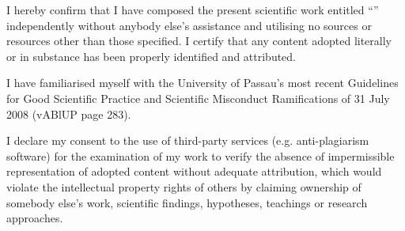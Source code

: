 I hereby confirm that I have composed the present scientific work entitled “\worktitle” independently without anybody else’s assistance and utilising no sources or resources other than those specified. I certify that any content adopted literally or in substance has been properly identified and attributed.

I have familiarised myself with the University of Passau’s most recent Guidelines for Good Scientific Practice and Scientific Misconduct Ramifications of 31 July 2008 (vABlUP page 283).

I declare my consent to the use of third-party services (e.g. anti-plagiarism software) for the examination of my work to verify the absence of impermissible representation of adopted content without adequate attribution, which would violate the intellectual property rights of others by claiming ownership of somebody else’s work, scientific findings, hypotheses, teachings or research approaches.

\cleardoublepage

